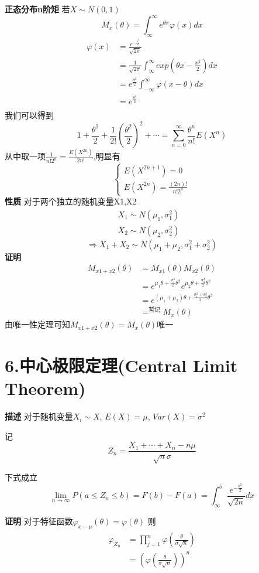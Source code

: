 \documentclass{article}
\begin{document}
\begin{CJK*}{UTF8}{gbsn}
\textbf{正态分布n阶矩}
若$X\sim N(0,1)$
\[
M_x(\theta) = \int^{\infty}_{\infty} e^{\theta x}\varphi (x) dx
\]
\[
\begin{split}
\varphi (x) 
	&= \frac{e^{-\frac{\lambda ^2}{2}}}{\sqrt{2 \pi}} \\
	&= \frac{1}{\sqrt{2 \pi}} \int^{\infty}_{\infty} exp(\theta x - \frac{x^2}{2}) dx \\
	&= e^{\frac{\theta ^2}{2}} \int^{\infty}_{-\infty} \varphi(x-\theta)dx \\
	&= e^{\frac{\theta ^2}{2}} \\
\end{split}
\]
我们可以得到
\[
	1
	+\frac{\theta ^2}{2} 
	+\frac{1}{2!}(\frac{\theta ^2}{2})^2
	+\cdots
	 = 
	\sum^{\infty}_{n=0}\frac{\theta ^n}{n!}E(X^n)
\]
从中取一项$\frac{1}{n!2^n} = \frac{E(X^{2n})}{2n!}$,明显有
\[
\begin{cases}
	E(X^{2n+1}) = 0\\
	E(X^{2n}) = \frac{(2n)!}{n!2^n}
\end{cases}
\]
\textbf{性质}
对于两个独立的随机变量X1,X2
\begin{align*}
	X_1 \sim N(\mu_1, \sigma_1^2) &\\
	X_2 \sim N(\mu_2, \sigma_2^2)
\end{align*}
\[
 \Rightarrow X_1+X_2\sim N(\mu_1 + \mu_2, \sigma_1^2 + \sigma_2^2)
\]
\textbf{证明}
\[
\begin{split}
M_{x1+x2}(\theta) 
	&= M_{x1}(\theta) M_{x2}(\theta) \\
	&= e^{\mu_1\theta +\frac{\sigma_1^2}{2}\theta^2} e^{\mu_2\theta +\frac{\sigma_2^2}{2}\theta^2}\\
	&= e^{(\mu_1 + \mu_2)\theta +\frac{\sigma_1^2 + \sigma_2^2}{2}\theta^2}\\
	&=^{\text{暂记}} M_x(\theta)
\end{split}
\]
由唯一性定理可知$M_{x1+x2}(\theta) = M_x(\theta)$唯一

\section{6.中心极限定理(Central Limit Theorem)}
\textbf{描述}
对于随机变量$X_i \sim X$, $E(X) = \mu$, $Var(X) = \sigma^2$

记$$Z_n = \frac{X_1+\cdots+X_n-n\mu}{\sqrt{n} \sigma}$$

下式成立$$\lim_{n\to \infty} P(a\leq Z_n \leq b) = F(b) - F(a) = \int^{b}_{\infty} \frac{e^{-\frac{\theta^2}{2}} }{\sqrt{2n}}dx$$

\textbf{证明}
对于特征函数$\varphi_{x-\mu}(\theta) = \varphi(\theta)$
则
\[
\begin{split}
\varphi_{Z_n} 
	&= \prod^n_{j=1} \varphi(\frac{\theta}{\sigma \sqrt{n}}) \\
	&= (\varphi(\frac{\theta}{\sigma \sqrt{n}}))^n \\
\end{split}
\]


\end{CJK*}
\end{document}
